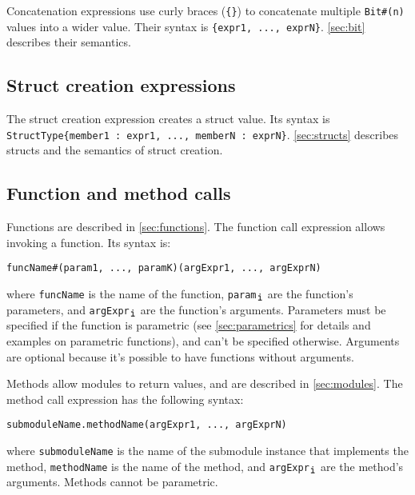 Concatenation expressions use curly braces (\verb|{}|) to concatenate multiple \verb|Bit#(n)| values into a wider value.
Their syntax is \verb|{expr1, ..., exprN}|.
\autoref{sec:bit} describes their semantics.

\subsection{Struct creation expressions}
\label{sec:structExpr}

The struct creation expression creates a struct value. Its syntax is
\texttt{StructType\{member1\,:\,expr1, ..., memberN\,:\,exprN\}}.
\autoref{sec:structs} describes structs and the semantics of struct creation.

\subsection{Function and method calls}
\label{sec:calls}

Functions are described in \autoref{sec:functions}. The function call expression allows invoking a function. Its syntax is:
\begin{center}
  \verb|funcName|\optStart\verb|#(param1, ..., paramK)|\optEnd\optStart\verb|(argExpr1, ..., argExprN)|\optEnd
\end{center}
where \verb|funcName| is the name of the function, \verb|param|$_{\verb|i|}$ are the function's parameters,
and \verb|argExpr|$_{\verb|i|}$ are the function's arguments.
Parameters must be specified if the function is parametric (see \autoref{sec:parametrics} for details and examples on parametric functions),
and can't be specified otherwise.
Arguments are optional because it's possible to have functions without arguments. 

Methods allow modules to return values, and are described in \autoref{sec:modules}. The method call expression has the following syntax:
\begin{center}
    \verb|submoduleName.methodName|\optStart\verb|(argExpr1, ..., argExprN)|\optEnd
\end{center}
where \verb|submoduleName| is the name of the submodule instance that implements the method,
\verb|methodName| is the name of the method, and \verb|argExpr|$_{\verb|i|}$ are the method's arguments.
Methods cannot be parametric.
